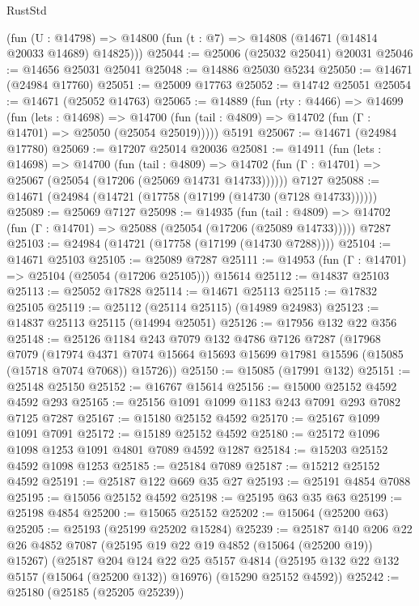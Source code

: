 \begin{lexlean}{RustStd}
\begin{coremodule}
    (fun (U : @14798) => @14800 (fun (t : @7) => @14808 (@14671 (@14814 @20033 @14689) @14825)))
@25044 := @25006 (@25032 @25041) @20031
@25046 := @14656 @25031 @25041
@25048 := @14886 @25030 @5234
@25050 := @14671 (@24984 @17760)
@25051 := @25009 @17763
@25052 := @14742 @25051
@25054 := @14671 (@25052 @14763)
@25065 := @14889
    (fun (rty : @4466) =>
    @14699
      (fun (lets : @14698) =>
      @14700 (fun (tail : @4809) => @14702 (fun (Γ : @14701) => @25050 (@25054 @25019)))))
    @5191
@25067 := @14671 (@24984 @17780)
@25069 := @17207 @25014 @20036
@25081 := @14911
    (fun (lets : @14698) =>
    @14700
      (fun (tail : @4809) =>
      @14702 (fun (Γ : @14701) => @25067 (@25054 (@17206 (@25069 @14731 @14733))))))
    @7127
@25088 := @14671 (@24984 (@14721 (@17758 (@17199 (@14730 (@7128 @14733))))))
@25089 := @25069 @7127
@25098 := @14935
    (fun (tail : @4809) => @14702 (fun (Γ : @14701) => @25088 (@25054 (@17206 (@25089 @14733)))))
    @7287
@25103 := @24984 (@14721 (@17758 (@17199 (@14730 @7288))))
@25104 := @14671 @25103
@25105 := @25089 @7287
@25111 := @14953 (fun (Γ : @14701) => @25104 (@25054 (@17206 @25105))) @15614
@25112 := @14837 @25103
@25113 := @25052 @17828
@25114 := @14671 @25113
@25115 := @17832 @25105
@25119 := @25112 (@25114 @25115) (@14989 @24983)
@25123 := @14837 @25113 @25115 (@14994 @25051)
@25126 := @17956 @132 @22 @356
@25148 := @25126
    @1184
    @243
    @7079
    @132
    @4786
    @7126
    @7287
    (@17968
      @7079
      (@17974 @4371 @7074 @15664 @15693 @15699 @17981 @15596 (@15085 (@15718 @7074 @7068)) @15726))
@25150 := @15085 (@17991 @132)
@25151 := @25148 @25150
@25152 := @16767 @15614
@25156 := @15000 @25152 @4592 @4592 @293
@25165 := @25156 @1091 @1099 @1183 @243 @7091 @293 @7082 @7125 @7287
@25167 := @15180 @25152 @4592
@25170 := @25167 @1099 @1091 @7091
@25172 := @15189 @25152 @4592
@25180 := @25172 @1096 @1098 @1253 @1091 @4801 @7089 @4592 @1287
@25184 := @15203 @25152 @4592 @1098 @1253
@25185 := @25184 @7089
@25187 := @15212 @25152 @4592
@25191 := @25187 @122 @669 @35 @27
@25193 := @25191 @4854 @7088
@25195 := @15056 @25152 @4592
@25198 := @25195 @63 @35 @63
@25199 := @25198 @4854
@25200 := @15065 @25152
@25202 := @15064 (@25200 @63)
@25205 := @25193 (@25199 @25202 @15284)
@25239 := @25187
    @140
    @206
    @22
    @26
    @4852
    @7087
    (@25195 @19 @22 @19 @4852 (@15064 (@25200 @19)) @15267)
    (@25187
      @204
      @124
      @22
      @25
      @5157
      @4814
      (@25195 @132 @22 @132 @5157 (@15064 (@25200 @132)) @16976)
      (@15290 @25152 @4592))
@25242 := @25180 (@25185 (@25205 @25239))

\end{coremodule}
\end{lexlean}

